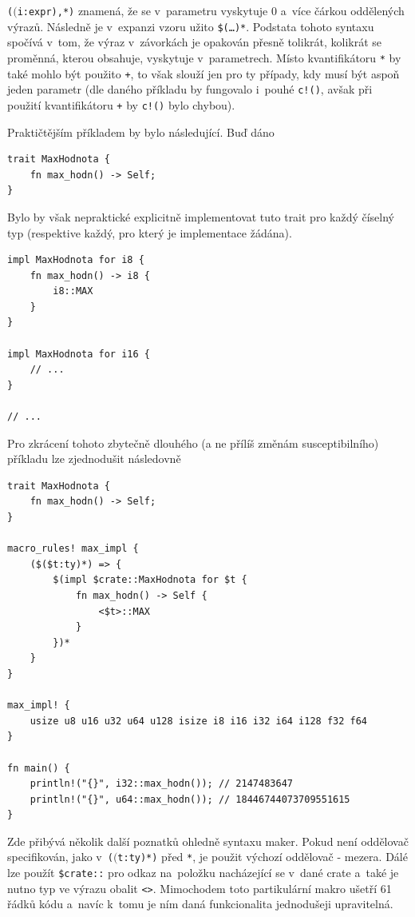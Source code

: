 \documentclass[a4paper, 12pt, twoside]{article} %
\newcommand{\rust}[1]{\texttt{#1}}
\begin{document}
			\rust{($($i:expr),*)} znamená, že se v~parametru vyskytuje 0 a~více čárkou oddělených výrazů. Následně je v~expanzi vzoru užito \texttt{\$(\dots)*}. Podstata tohoto syntaxu spočívá v~tom, že výraz v~závorkách je opakován přesně tolikrát, kolikrát se proměnná, kterou obsahuje, vyskytuje v~parametrech. Místo kvantifikátoru \rust{*} by také mohlo být použito \rust{+}, to však slouží jen pro ty případy, kdy musí být aspoň jeden parametr (dle daného příkladu by fungovalo i~pouhé \rust{c!()}, avšak při použití kvantifikátoru \rust{+} by \rust{c!()} bylo chybou).
			
			Praktičtějším příkladem by bylo následující. Buď dáno
			\begin{verbatim}
trait MaxHodnota {
	fn max_hodn() -> Self;
}
			\end{verbatim}
			
			Bylo by však nepraktické explicitně implementovat tuto trait pro každý číselný typ (respektive každý, pro který je implementace žádána).
			\begin{verbatim}
impl MaxHodnota for i8 {
	fn max_hodn() -> i8 {
		i8::MAX
	}
}

impl MaxHodnota for i16 {
	// ...
}

// ...
			\end{verbatim}
			
			Pro zkrácení tohoto zbytečně dlouhého (a ne přílíš změnám susceptibilního) příkladu lze zjednodušit následovně
			\begin{verbatim}
trait MaxHodnota {
	fn max_hodn() -> Self;
}

macro_rules! max_impl {
	($($t:ty)*) => {
		$(impl $crate::MaxHodnota for $t {
			fn max_hodn() -> Self {
				<$t>::MAX
			}
		})*
	}
}

max_impl! {
	usize u8 u16 u32 u64 u128 isize i8 i16 i32 i64 i128 f32 f64
}

fn main() {
	println!("{}", i32::max_hodn()); // 2147483647
	println!("{}", u64::max_hodn()); // 18446744073709551615
}
			\end{verbatim}
			
			Zde přibývá několik další poznatků ohledně syntaxu maker. Pokud není oddělovač specifikován, jako v~\rust{($($t:ty)*)} před \rust{*}, je použit výchozí oddělovač - mezera. Dálé lze použít \texttt{\$crate::} pro odkaz na~položku nacházející se v~dané crate a~také je nutno typ ve výrazu obalit \rust{<>}. Mimochodem toto partikulární makro ušetří 61 řádků kódu a~navíc k~tomu je ním daná funkcionalita jednodušeji upravitelná.\cite{dekl_makra}
\end{document}
